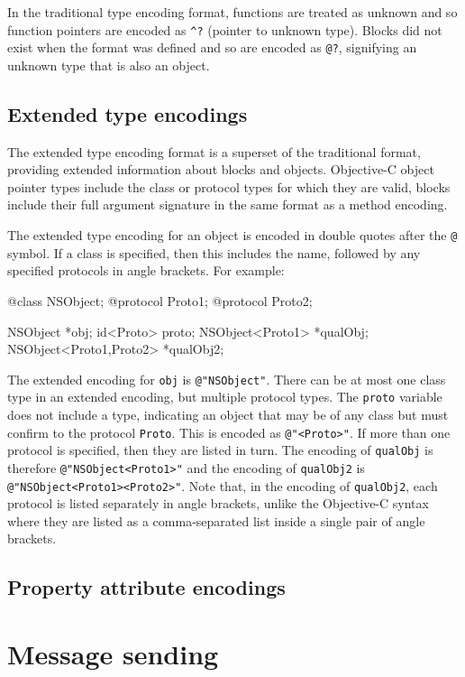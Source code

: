 \documentclass[a4paper]{report}
\newcommand{\objc}[1]{\lstinline[language={[Objective]C}]{#1}}
\begin{document}
In the traditional type encoding format, functions are treated as unknown and so function pointers are encoded as \texttt{\^{}?} (pointer to unknown type).
Blocks did not exist when the format was defined and so are encoded as \texttt{@?}, signifying an unknown type that is also an object.

\section{Extended type encodings}

The extended type encoding format is a superset of the traditional format, providing extended information about blocks and objects.
Objective-C object pointer types include the class or protocol types for which they are valid, blocks include their full argument signature in the same format as a method encoding.

The extended type encoding for an object is encoded in double quotes after the \texttt{@} symbol.
If a class is specified, then this includes the name, followed by any specified protocols in angle brackets.
For example:

\begin{codesnippet}
@class NSObject;
@protocol Proto1;
@protocol Proto2;

NSObject *obj;
id<Proto> proto;
NSObject<Proto1> *qualObj;
NSObject<Proto1,Proto2> *qualObj2;
\end{codesnippet}

The extended encoding for \objc{obj} is \texttt{@"NSObject"}.
There can be at most one class type in an extended encoding, but multiple protocol types.
The \objc{proto} variable does not include a type, indicating an object that may be of any class but must confirm to the protocol \objc{Proto}.
This is encoded as \texttt{@"<Proto>"}.
If more than one protocol is specified, then they are listed in turn.
The encoding of \objc{qualObj} is therefore \texttt{@"NSObject<Proto1>"} and the encoding of \objc{qualObj2} is \texttt{@"NSObject<Proto1><Proto2>"}.
Note that, in the encoding of \objc{qualObj2}, each protocol is listed separately in angle brackets, unlike the Objective-C syntax where they are listed as a comma-separated list inside a single pair of angle brackets.

\section{Property attribute encodings}



\chapter{Message sending}
\end{document}
